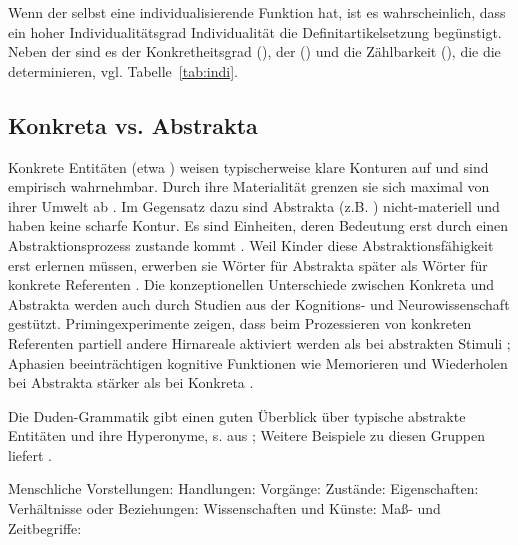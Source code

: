 \noindent
Wenn der  selbst eine individualisierende Funktion hat, ist es wahrscheinlich, dass ein hoher Individualitätsgrad Individualität die Definitartikelsetzung  begünstigt. Neben der  sind es der Konkretheitsgrad    (), der   () und die Zählbarkeit (), die 
die   determinieren, vgl. Tabelle~\ref{tab:indi}.

\subsection{Konkreta vs. Abstrakta}\label{sec:konabst}

Konkrete  Entitäten (etwa ) weisen typischerweise klare Konturen auf und sind empirisch wahrnehmbar. Durch ihre Materialität grenzen sie sich maximal von ihrer Umwelt ab \parencite[344]{Szczepaniak2011}. Im Gegensatz dazu sind Abstrakta (z.B. ) nicht-materiell und haben keine scharfe Kontur. Es sind Einheiten, deren Bedeutung erst durch einen Abstraktionsprozess zustande kommt \parencite[279]{Ewald1992}. Weil Kinder diese Abstraktionsfähigkeit erst erlernen müssen, erwerben sie Wörter für Abstrakta  später als Wörter für konkrete  Referenten \parencite[396]{Bergelson2013}. Die konzeptionellen Unterschiede zwischen Konkreta  und Abstrakta  werden auch durch Studien aus der Kognitions- und Neurowissenschaft gestützt. Primingexperimente zeigen, dass beim Prozessieren von konkreten  Referenten partiell andere Hirnareale aktiviert werden als bei abstrakten  Stimuli \parencite{Binder2005,Weiss2013}; Aphasien beeinträchtigen kognitive Funktionen wie Memorieren und Wiederholen bei Abstrakta  stärker als bei  Konkreta \parencite{Moss1995,Moss1997}.

Die Duden-Grammatik gibt einen guten Überblick über typische abstrakte Entitäten  und ihre Hyperonyme, s.  aus \textcite[146--147]{Duden2009}; Weitere Beispiele zu diesen Gruppen liefert \textcite[143]{Schrauf2011}.

\begin{exe}
	\ex \label{ex:abstrakta}
	\begin{xlist}
		\ex \label{ex:vorstellung} Menschliche Vorstellungen: 
		\ex \label{ex:handlungen} Handlungen: 
		\ex \label{ex:vorgang} Vorgänge: 
		\ex \label{ex:zustand} Zustände: 
		\ex \label{ex:eigenschaft} Eigenschaften:  
		\ex \label{ex:verhaeltnise} Verhältnisse oder Beziehungen: 
		\ex \label{ex:wissenschaft} Wissenschaften und Künste: 
		\ex \label{ex:zeit} Maß- und Zeitbegriffe: 
	\end{xlist}
\end{exe} 

